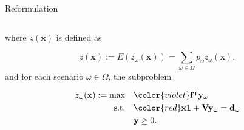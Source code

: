 \begin{frame}{Reformulation}
\begin{columns}
\begin{column}{0.49\textwidth}
      where $z(\mathbf{x})$ is defined as 

    $$z(\mathbf{x}) := E(z_{\omega}(\mathbf{x})) = \sum_{\omega \in \Omega} p_{\omega} z_{\omega}(\mathbf{x}),$$ and for each scenario $\omega \in \Omega$, the subproblem

\begin{equation}\label{BD_sub}
  \begin{aligned}
    z_{\omega}(\mathbf{x}) := \max \quad & {\color{violet} \mathbf{f}^{\intercal} \mathbf{y}_{\omega}} \\
    \text {s.t.} \quad & {\color{red}\mathbf{x} \mathbf{1} + \mathbf{V} \mathbf{y}_{\omega} = \mathbf{d}_{\omega}} \\
     & \mathbf{y} \geq 0.
  \end{aligned}
  \end{equation}
    \end{column}
\end{columns}
\end{frame}





